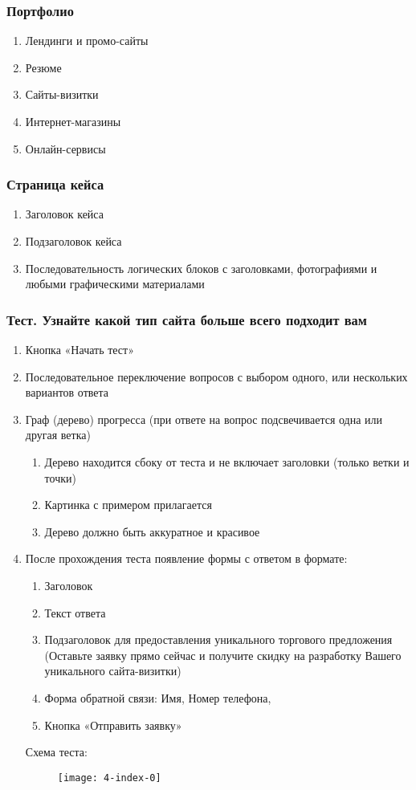 \subsubsection{Портфолио}
\begin{enumerate}
  \item Лендинги и промо-сайты
  \item Резюме
  \item Сайты-визитки
  \item Интернет-магазины
  \item Онлайн-сервисы
\end{enumerate}

\subsubsection{Страница кейса}
\begin{enumerate}
  \item Заголовок кейса
  \item Подзаголовок кейса
  \item Последовательность логических блоков с заголовками, фотографиями и любыми графическими материалами
\end{enumerate}

\subsubsection{Тест. Узнайте какой тип сайта больше всего подходит вам}
\begin{enumerate}
  \item Кнопка «Начать тест»
  \item Последовательное переключение вопросов с выбором одного, или нескольких вариантов ответа
  \item Граф (дерево) прогресса (при ответе на вопрос подсвечивается одна или другая ветка)
  \begin{enumerate}
    \item Дерево находится сбоку от теста и не включает заголовки (только ветки и точки)
    \item Картинка с примером прилагается
    \item Дерево должно быть аккуратное и красивое
  \end{enumerate}
  \item После прохождения теста появление формы с ответом в формате:
  \begin{enumerate}
    \item Заголовок
    \item Текст ответа
    \item Подзаголовок для предоставления уникального торгового предложения (Оставьте заявку прямо сейчас и получите скидку на разработку Вашего уникального сайта-визитки)
    \item Форма обратной связи: Имя, Номер телефона,
    \item Кнопка «Отправить заявку»
  \end{enumerate}
  Схема теста:
  \begin{figure}[H]
    \texttt{[image: 4-index-0]}
  \end{figure}
\end{enumerate}

